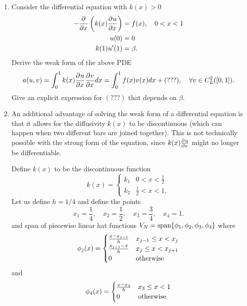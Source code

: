 
  \begin{enumerate}
 \item Consider the differential equation with $k(x) > 0$
 \begin{align*}
-\frac{\partial^{} }{\partial x^{}}\left(k(x)\frac{\partial^{} u}{\partial x^{}}\right) &= f(x), \quad 0 < x < 1\\
 u(0) &= 0 \\
 k(1) u'(1) &= \beta.  
 \end{align*}
Derive the weak form of the above PDE
\[
a(u,v) = \int_0^1k(x) \frac{\partial^{} u}{\partial x^{}}\frac{\partial^{} v}{\partial x^{}}dx = \int_0^1 f(x)v(x)dx + (???), \quad \forall v\in C^2_L([0,1]).
\]
Give an explicit expression for $(???)$ that depends on $\beta$.  
\item An additional advantage of solving the weak form of a differential equation is that it allows for the diffusivity $k(x)$ to be discontinuous (which can happen when two different bars are joined together).  This is not technically possible with the strong form of the equation, since $k(x)\frac{\partial^{} u}{\partial x^{}}$ might no longer be differentiable.  

Define $k(x)$ to be the discontinuous function
 \[
 k(x) = \begin{cases}
k_1 & 0 < x < \frac{1}{2}\\
k_2 & \frac{1}{2} < x < 1,
 \end{cases}
 \]
Let us define $h = 1/4$ and define the points
 \[
 x_1 = \frac{1}{4}, \quad x_2 = \frac{1}{2}, \quad x_3 = \frac{3}{4}, \quad x_4 = 1.
 \]
and span of piecewise linear hat functions $V_N = {\rm span}\{\phi_1,\phi_2,\phi_3,\phi_4\}$ where
\[
\phi_j(x) = \begin{cases}
\frac{x-x_{j-1}}{h} & x_{j-1} \leq x < x_j\\
\frac{x_{j+1}-x}{h} & x_{j} \leq x < x_{j+1}\\
0 & {\rm otherwise}
\end{cases}
\]
and
\[
\phi_4(x) = \begin{cases}
\frac{x-x_3}{h} & x_{3} \leq x < 1\\
0 & {\rm otherwise}
\end{cases}
\]


\end{enumerate}
